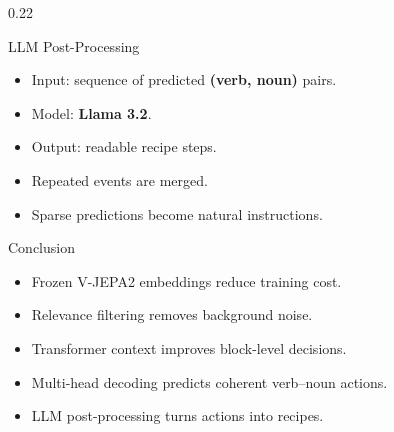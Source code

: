 \documentclass[final, landscape]{beamer}
\begin{document}
\begin{frame}[t]
\begin{columns}[t]
\begin{column}{0.22\paperwidth}

  \begin{block}{LLM Post-Processing}
    \begin{itemize}
      \item Input: sequence of predicted \textbf{(verb, noun)} pairs.
      \item Model: \textbf{Llama 3.2}.
      \item Output: readable recipe steps.
      \item Repeated events are merged.
      \item Sparse predictions become natural instructions.
    \end{itemize}
  \end{block}

  \begin{block}{Conclusion}
    \begin{itemize}
      \item Frozen V-JEPA2 embeddings reduce training cost.
      \item Relevance filtering removes background noise.
      \item Transformer context improves block-level decisions.
      \item Multi-head decoding predicts coherent verb--noun actions.
      \item LLM post-processing turns actions into recipes.
    \end{itemize}
  \end{block}

\end{column}

\end{columns}
\end{frame}
\end{document}

